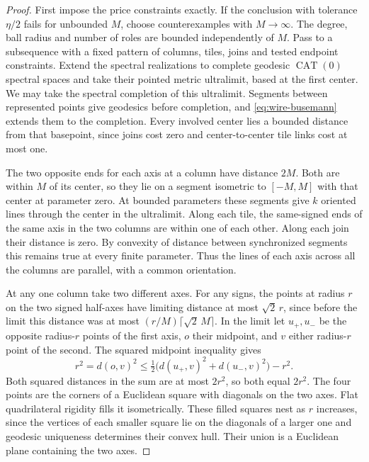 \begin{proof}
First impose the price constraints exactly. If the conclusion with
tolerance $\eta/2$ fails for unbounded $M$, choose counterexamples with
$M\to\infty$. The degree, ball radius and number of roles are bounded
independently of $M$. Pass to a subsequence with a fixed pattern of
columns, tiles, joins and tested endpoint constraints. Extend the
spectral realizations to complete geodesic $\operatorname{CAT}(0)$
spectral spaces and take their pointed metric ultralimit, based at the
first center. We may take the spectral completion of this ultralimit. Segments
between represented points give geodesics before completion, and
\eqref{eq:wire-busemann} extends them to the completion.
Every involved center lies a bounded distance from that
basepoint, since joins cost zero and center-to-center tile links cost
at most one.

The two opposite ends for each axis at a column have distance $2M$.
Both are within $M$ of its center, so they lie on a segment isometric
to $[-M,M]$ with that center at parameter zero. At bounded parameters
these segments give $k$ oriented lines through the center in the
ultralimit. Along each tile, the same-signed ends of the same axis in
the two columns are within one of each other. Along each join their
distance is zero. By convexity of distance between synchronized
segments this remains true at every finite parameter. Thus the lines
of each axis across all the columns are parallel, with a common
orientation.

At any one column take two different axes. For any signs, the points
at radius $r$ on the two signed half-axes have limiting distance at
most $\sqrt{2}\,r$, since before the limit this distance was at most
$(r/M)\lceil\sqrt{2}\,M\rceil$. In the limit let $u_+,u_-$ be the
opposite radius-$r$ points of the first axis, $o$ their midpoint, and
$v$ either radius-$r$ point of the second. The squared midpoint
inequality gives
\[
 r^2=d(o,v)^2\le
 \tfrac12\big(d(u_+,v)^2+d(u_-,v)^2\big)-r^2.
\]
Both squared distances in the sum are at most $2r^2$, so both equal
$2r^2$. The four points are the corners of a Euclidean square with
diagonals on the two axes. Flat quadrilateral rigidity fills it
isometrically. These filled squares nest as $r$ increases, since the
vertices of each smaller square lie on the diagonals of a larger one
and geodesic uniqueness determines their convex hull. Their union is
a Euclidean plane containing the two axes.


\end{proof}
